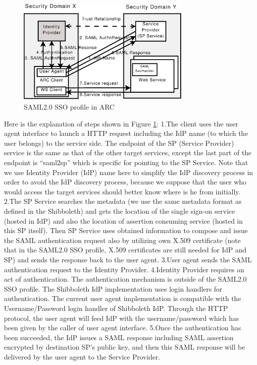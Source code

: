 \begin{figure}
\includegraphics[width=0.75\textwidth]{SAML2SSO.eps}
\caption{SAML2.0 SSO profile in ARC}
\label{fig:SAML2SSO}
\end{figure}
Here is the explanation of steps shown in Figure \ref{fig:SAML2SSO}:
1.The client uses the user agent interface to launch a HTTP request including the IdP name (to which the user belongs) to the service side. The endpoint of the SP (Service Provider) service is the same as that of the other target services, except the last part of the endpoint is “saml2sp” which is specific for pointing to the SP Service. Note that we use Identity Provider (IdP) name here to simplify the IdP discovery process in order to avoid the IdP discovery process, because we suppose that the user who would access the target services should better know where is he from initially.
2.The SP Service searches the metadata (we use the same metadata format as defined in the Shibboleth) and gets the location of the single sign-on service (hosted in IdP) and also the location of assertion consuming service (hosted in this SP itself). Then SP Service uses obtained information to compose and issue the SAML authentication request also by utilizing own X.509 certificate (note that in the SAML2.0 SSO profile, X.509 certificates are still needed for IdP and SP) and sends the response back to the user agent.
3.User agent sends the SAML authentication request to the Identity Provider.
4.Identity Provider requires an act of authentication. The authentication mechanism is outside of the SAML2.0 SSO profile. The Shibboleth IdP implementation uses login handlers for authentication. The current user agent implementation is compatible with the Username/Password login handler of Shibboleth IdP. Through the HTTP protocol, the user agent will feed IdP with the username/password which has been given by the caller of user agent interface.
5.Once the authentication has been succeeded, the IdP issues a SAML response including SAML assertion encrypted by destination SP’s public key, and then this SAML response will be delivered by the user agent to the Service Provider.
